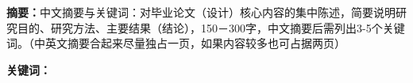 

\clearpage
\setcounter{page}{1}
\begin{center}
\fontsize{15.75pt}{\baselineskip}
\vspace*{24pt}
\heiti{\sdnutitlechs}  %

\vspace*{14pt}
\fontsize{14pt}{\baselineskip}
\fangsong{\sdnuauthorchs} %

\fontsize{10.5pt}{20pt}
\vspace*{18pt}

\end{center}

{}

\fontsize{12pt}{25pt}
\textbf{摘要：}中文摘要与关键词：对毕业论文（设计）核心内容的集中陈述，简要说明研究目的、研究方法、主要结果（结论），150－300字，中文摘要后需列出3-5个关键词。（中英文摘要合起来尽量独占一页，如果内容较多也可占据两页）

\vspace*{14pt}
\textbf{关键词：}\sdnukeywchs

